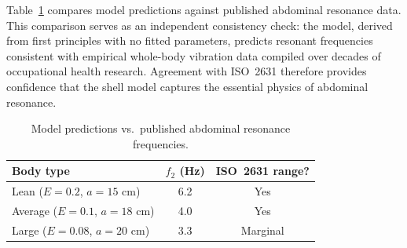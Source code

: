 Table~\ref{tab:iso} compares model predictions against published abdominal
resonance data.  This comparison serves as an independent consistency check: the model,
derived from first principles with no fitted parameters, predicts resonant
frequencies consistent with empirical whole-body vibration data compiled over
decades of occupational health research.  Agreement with ISO~2631 therefore
provides confidence that the shell model captures the essential physics of abdominal
resonance.

\begin{table}[htbp]
  \centering
  \caption{Model predictions vs.\ published abdominal resonance frequencies.}
  \label{tab:iso}
  \begin{tabular}{lcc}
    \hline
    Body type & $f_2$ (Hz) & ISO~2631 range? \\
    \hline
    Lean ($E = 0.2$, $a = 15$ cm) & 6.2 & Yes \\
    Average ($E = 0.1$, $a = 18$ cm) & 4.0 & Yes \\
    Large ($E = 0.08$, $a = 20$ cm) & 3.3 & Marginal \\
    \hline
  \end{tabular}
\end{table}
